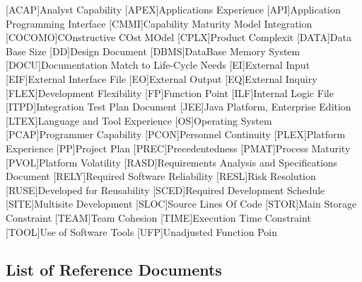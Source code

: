 \begin{acronym}[ACAP] %

[ACAP]{Analyst Capability}
[APEX]{Applications Experience}
[API]{Application Programming Interface}
[CMMI]{Capability Maturity Model Integration}
[COCOMO]{COnstructive COst MOdel}
[CPLX]{Product Complexit}
[DATA]{Data Base Size}
[DD]{Design Document}
[DBMS]{DataBase Memory System}
[DOCU]{Documentation Match to Life-Cycle Needs}
[EI]{External Input}
[EIF]{External Interface File}
[EO]{External Output}
[EQ]{External Inquiry}
[FLEX]{Development Flexibility}
[FP]{Function Point}
[ILF]{Internal Logic File}
[ITPD]{Integration Test Plan Document}
[JEE]{Java Platform, Enterprise Edition}
[LTEX]{Language and Tool Experience}
[OS]{Operating System}
[PCAP]{Programmer Capability}
[PCON]{Personnel Continuity}
[PLEX]{Platform Experience}
[PP]{Project Plan}
[PREC]{Precedentedness}
[PMAT]{Process Maturity}
[PVOL]{Platform Volatility}
[RASD]{Requirements Analysis and Specifications Document}
[RELY]{Required Software Reliability}
[RESL]{Risk Resolution}
[RUSE]{Developed for Reusability}
[SCED]{Required Development Schedule}
[SITE]{Multisite Development}
[SLOC]{Source Lines Of Code}
[STOR]{Main Storage Constraint}
[TEAM]{Team Cohesion}
[TIME]{Execution Time Constraint}
[TOOL]{Use of Software Tools}
[UFP]{Unadjusted Function Poin}



\end{acronym}

\subsection{List of Reference Documents}

